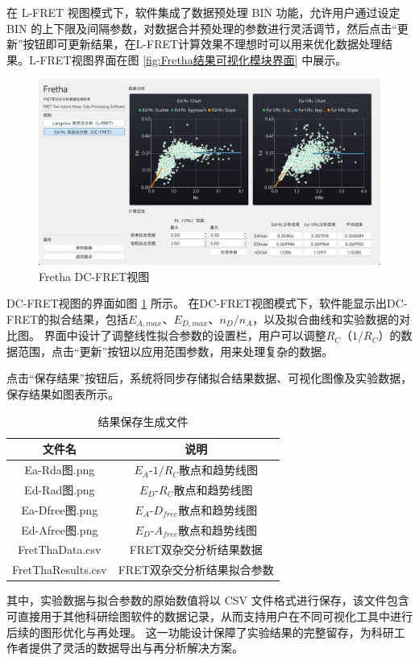 在 L-FRET 视图模式下，软件集成了数据预处理 BIN 功能，允许用户通过设定 BIN 的上下限及间隔参数，对数据合并预处理的参数进行灵活调节，然后点击“更新”按钮即可更新结果，在L-FRET计算效果不理想时可以用来优化数据处理结果。L-FRET视图界面在图 \ref{fig:Fretha结果可视化模块界面} 中展示。

\begin{figure}[htbp]
  \centering
  \includegraphics[width=0.9\linewidth]{../figures/2/2_DC-FRET结果界面.png}
  \caption{Fretha DC-FRET视图}
  \label{fig:fretha_dc_fret}
\end{figure}

DC-FRET视图的界面如图 \ref{fig:fretha_dc_fret} 所示。
在DC-FRET视图模式下，软件能显示出DC-FRET的拟合结果，包括$E_{A,max}$、$E_{D,max}$、$n_D/n_A$，以及拟合曲线和实验数据的对比图。
界面中设计了调整线性拟合参数的设置栏，用户可以调整$R_C$（$1/R_C$）的数据范围，点击“更新”按钮以应用范围参数，用来处理复杂的数据。

点击“保存结果”按钮后，系统将同步存储拟合结果数据、可视化图像及实验数据，保存结果如图表所示。
\begin{table}[htbp]
  \centering
  \caption{结果保存生成文件}
  \label{tab:fretha_result_list}
    \begin{tabular}{cc}
      \toprule[1.5pt]
      {文件名} & {说明} \\
      \midrule
      Ea-Rda图.png & $E_A$-$1/R_C$散点和趋势线图 \\
      Ed-Rad图.png & $E_D$-$R_C$散点和趋势线图 \\
      Ea-Dfree图.png & $E_A$-$D_{free}$散点和趋势线图 \\
      Ed-Afree图.png & $E_D$-$A_{free}$散点和趋势线图 \\
      FretThaData.csv & FRET双杂交分析结果数据 \\
      FretThaResults.csv & FRET双杂交分析结果拟合参数 \\
      \bottomrule[1.5pt]
    \end{tabular}
\end{table}
其中，实验数据与拟合参数的原始数值将以 CSV 文件格式进行保存，该文件包含可直接用于其他科研绘图软件的数据记录，从而支持用户在不同可视化工具中进行后续的图形优化与再处理。
这一功能设计保障了实验结果的完整留存，为科研工作者提供了灵活的数据导出与再分析解决方案。
\fi

